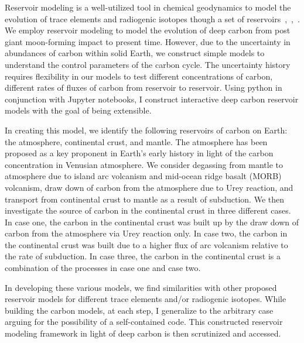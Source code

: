 Reservoir modeling is a well-utilized tool in chemical geodynamics to model the evolution of trace elements and radiogenic isotopes though a set of reservoirs~\cite{ACJ-BO-DB:1980},~\cite{KLH-WGJ:1990},~\cite{SNH-ZK:2001}. We employ reservoir modeling to model the evolution of deep carbon from post giant moon-forming impact to present time. However, due to the uncertainty in abundances of carbon within solid Earth, we construct simple models to understand the control parameters of the carbon cycle. The uncertainty history requires flexibility in our models to test different concentrations of carbon, different rates of fluxes of carbon from reservoir to reservoir. Using python in conjunction with Jupyter notebooks, I construct interactive deep carbon reservoir models with the goal of being extensible. 

In creating this model, we identify the following reservoirs of carbon on Earth: the atmosphere, continental crust, and mantle. The atmosphere has been proposed as a key proponent in Earth's early history in light of the carbon concentration in Venusian atmosphere. We consider degassing from mantle to atmosphere due to island arc volcanism and mid-ocean ridge basalt (MORB) volcanism, draw down of carbon from the atmosphere due to Urey reaction, and transport from continental crust to mantle as a result of subduction. We then investigate the source of carbon in the continental crust in three different cases. In case one, the carbon in the continental crust was built up by the draw down of carbon from the atmosphere via Urey reaction only. In case two, the carbon in the continental crust was built due to a higher flux of arc volcanism relative to the rate of subduction. In case three, the carbon in the continental crust is a combination of the processes in case one and case two.

In developing these various models, we find similarities with other proposed reservoir models for different trace elements and/or radiogenic isotopes. While building the carbon models, at each step, I generalize to the arbitrary case arguing for the possibility of a self-contained code. This constructed reservoir modeling framework in light of deep carbon is then scrutinized and accessed.
